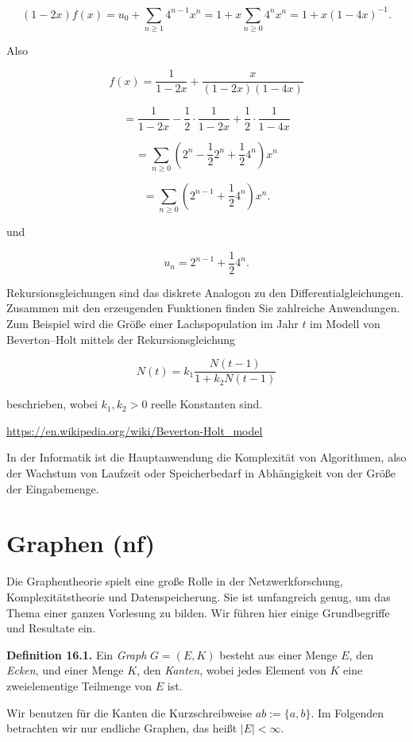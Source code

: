 \documentclass[9pt]{article}
\begin{document}
\[
(1 - 2x)f(x) = u_0 + \sum_{n \geq 1} 4^{n-1} x^n = 1 + x \sum_{n \geq 0} 4^n x^n = 1 + x(1 - 4x)^{-1}.
\]

Also

\[
f(x) = \frac{1}{1 - 2x} + \frac{x}{(1 - 2x)(1 - 4x)}
\]

\[
= \frac{1}{1 - 2x} - \frac{1}{2} \cdot \frac{1}{1 - 2x} + \frac{1}{2} \cdot \frac{1}{1 - 4x}
\]

\[
= \sum_{n \geq 0} \left( 2^n - \frac{1}{2} 2^n + \frac{1}{2} 4^n \right) x^n
\]

\[
= \sum_{n \geq 0} \left( 2^{n-1} + \frac{1}{2} 4^n \right) x^n.
\]

und

\[
u_n = 2^{n-1} + \frac{1}{2} 4^n.
\]

Rekursionsgleichungen sind das diskrete Analogon zu den Differentialgleichungen. 
Zusammen mit den erzeugenden Funktionen finden Sie zahlreiche Anwendungen. 
Zum Beispiel wird die Größe einer Lachspopulation im Jahr \( t \) im Modell von Beverton–Holt mittels der Rekursionsgleichung

\[
N(t) = k_1 \frac{N(t - 1)}{1 + k_2 N(t - 1)}
\]

beschrieben, wobei \( k_1, k_2 > 0 \) reelle Konstanten sind.

\url{https://en.wikipedia.org/wiki/Beverton-Holt_model}

In der Informatik ist die Hauptanwendung die Komplexität von Algorithmen, also der Wachstum von Laufzeit oder Speicherbedarf in Abhängigkeit von der Größe der Eingabemenge.



\section{Graphen (nf)}
Die Graphentheorie spielt eine große Rolle in der Netzwerkforschung, Komplexitätstheorie und Datenspeicherung. Sie ist umfangreich genug, um das Thema einer ganzen Vorlesung zu bilden. Wir führen hier einige Grundbegriffe und Resultate ein.

\textbf{Definition 16.1.}  
Ein \textit{Graph} \( G = (E, K) \) besteht aus einer Menge \( E \), den \textit{Ecken}, und einer Menge \( K \), den \textit{Kanten}, wobei jedes Element von \( K \) eine zweielementige Teilmenge von \( E \) ist.  

Wir benutzen für die Kanten die Kurzschreibweise \( ab := \{a, b\} \). Im Folgenden betrachten wir nur endliche Graphen, das heißt \( |E| < \infty \).
\end{document}
